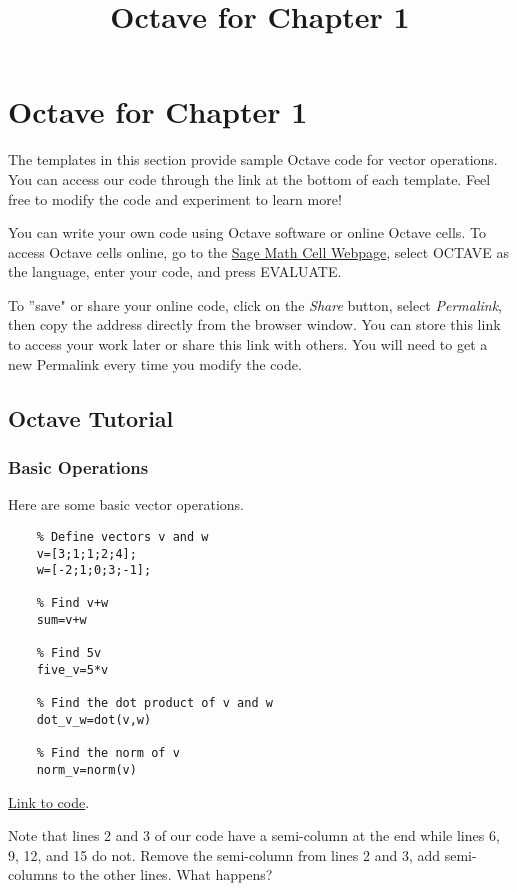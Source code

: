 \documentclass{ximera}
\title{Octave for Chapter 1} \license{CC BY-NC-SA 4.0}
\begin{document}
\begin{abstract}
\end{abstract}
\maketitle
\section*{Octave for Chapter 1}

The templates in this section provide sample Octave code for vector operations. You can access our code through the link at the bottom of each template.  Feel free to modify the code and experiment to learn more!  

You can write your own code using Octave software or online Octave cells.  To access Octave cells online, go to the \href{https://sagecell.sagemath.org/}{Sage Math Cell Webpage}, select OCTAVE as the language, enter your code, and press EVALUATE.  

To ''save" or share your online code, click on the \emph{Share} button, select \emph{Permalink}, then copy the address directly from the browser window.  You can store this link to access your work later or share this link with others.  You will need to get a new Permalink every time you modify the code.

\subsection*{Octave Tutorial}
\subsubsection*{Basic Operations}

\begin{template}\label{temp:vectorOps}
Here are some basic vector operations.
\begin{verbatim}
    % Define vectors v and w
    v=[3;1;1;2;4];
    w=[-2;1;0;3;-1]; 

    % Find v+w  
    sum=v+w

    % Find 5v
    five_v=5*v

    % Find the dot product of v and w
    dot_v_w=dot(v,w)

    % Find the norm of v
    norm_v=norm(v)
\end{verbatim}

\href{https://sagecell.sagemath.org/?z=eJxdTUsKwyAQ3QveYTaBpG2gSZqVuCu9RChSolIX0WDMeP2O3TSUWbw37zNTwd1Y5w2gmVOIGyC8vIbMGcppEB1NL25PwVmWU9vTehWDaLuicFbBw1EazxmAs21fJNGDMSJn1qFRKMcTHoz0NqBDgjUGvc8Jgv09Jl2hypKwxktu_mo-xOWb56xQOl2gxuYDFmw51w==&lang=octave&interacts=eJyLjgUAARUAuQ==}{Link to code}.

\begin{remark}
    Note that lines 2 and 3 of our code have a semi-column at the end while lines 6, 9, 12, and 15 do not.  Remove the semi-column from lines 2 and 3, add semi-columns to the other lines.  What happens?
\end{remark}
\end{template}
\end{document}
